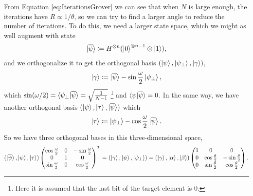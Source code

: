 \documentclass[a4paper,10pt]{book}
\numberwithin{equation}{section}
\begin{document}
From Equation \ref{eq:IterationsGrover} we can see that when $N$ is large enough, the iterations have $R\propto 1/\theta$, so we can try to find a larger angle to reduce the number of iterations. To do this, we need a larger state space, which we might as well augment with state
\begin{equation}
    \ket{\overline{\psi}}\coloneqq H^{\otimes n}(\ket{0}^{\otimes n-1}\otimes\ket{1}),
\end{equation}
and we orthogonalize it to get the orthogonal basis $(\ket{\psi},\ket{\psi_{\perp}},\ket{\gamma})$,
\begin{equation}
    \ket{\gamma}\coloneqq \ket{\overline{\psi}}-\sin\frac{\omega}{2}\ket{\psi_{\perp}},
\end{equation}
which $\sin(\omega/2)=\braket{\psi_{\perp}|\overline{\psi}}=\sqrt{\frac{1}{N-1}}$ \footnote{Here it is assumed that the last bit of the target element is $0$.} and $\braket{\psi|\overline{\psi}}=0$. In the same way, we have another orthogonal basis $(\ket{\psi},\ket{\tau},\ket{\overline{\psi}})$ which
\begin{equation}
    \ket{\tau}\coloneqq \ket{\psi_{\perp}}-\cos\frac{\omega}{2}\ket{\overline{\psi}}.
\end{equation}
So we have three orthogonal bases in this three-dimensional space,
\begin{equation*}
    (\ket{\overline{\psi}},\ket{\psi},\ket{\tau})
    \begin{pmatrix}
        \cos\frac{\omega}{2} & 0 & -\sin\frac{\omega}{2} \\
        0                    & 1 & 0                     \\
        \sin\frac{\omega}{2} & 0 & \cos\frac{\omega}{2}
    \end{pmatrix}
    ^{T}=(\ket{\gamma},\ket{\psi},\ket{\psi_{\perp}})
    =(\ket{\gamma},\ket{\alpha},\ket{\beta})
    \begin{pmatrix}
        1 & 0                    & 0                     \\
        0 & \cos\frac{\theta}{2} & -\sin\frac{\theta}{2} \\
        0 & \sin\frac{\theta}{2} & \cos\frac{\theta}{2}
    \end{pmatrix}
    .
\end{equation*}
\end{document}
